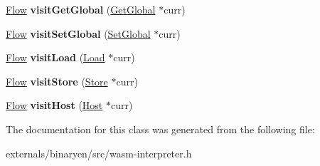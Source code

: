 \begin{DoxyCompactItemize}
\mbox{\label{classwasm_1_1_constant_expression_runner_a58cb10652d4f7dc7dd55566f0e7d858f}} 
\mbox{\hyperlink{classwasm_1_1_flow}{Flow}} {\bfseries visit\+Get\+Global} (\mbox{\hyperlink{classwasm_1_1_get_global}{Get\+Global}} $\ast$curr)
\item 
\mbox{\label{classwasm_1_1_constant_expression_runner_a05c9a5c0f8cbe2a47b7d4b7477f91be8}} 
\mbox{\hyperlink{classwasm_1_1_flow}{Flow}} {\bfseries visit\+Set\+Global} (\mbox{\hyperlink{classwasm_1_1_set_global}{Set\+Global}} $\ast$curr)
\item 
\mbox{\label{classwasm_1_1_constant_expression_runner_aa31bdf2f3509c36f3dffa40c96bfe49e}} 
\mbox{\hyperlink{classwasm_1_1_flow}{Flow}} {\bfseries visit\+Load} (\mbox{\hyperlink{classwasm_1_1_load}{Load}} $\ast$curr)
\item 
\mbox{\label{classwasm_1_1_constant_expression_runner_adb1cd9c0e1844089856f38e159a25f17}} 
\mbox{\hyperlink{classwasm_1_1_flow}{Flow}} {\bfseries visit\+Store} (\mbox{\hyperlink{classwasm_1_1_store}{Store}} $\ast$curr)
\item 
\mbox{\label{classwasm_1_1_constant_expression_runner_aab6888f756cc73014818b846d6148f79}} 
\mbox{\hyperlink{classwasm_1_1_flow}{Flow}} {\bfseries visit\+Host} (\mbox{\hyperlink{classwasm_1_1_host}{Host}} $\ast$curr)
\end{DoxyCompactItemize}


The documentation for this class was generated from the following file\+:\begin{DoxyCompactItemize}
\item 
externals/binaryen/src/wasm-\/interpreter.\+h\end{DoxyCompactItemize}
